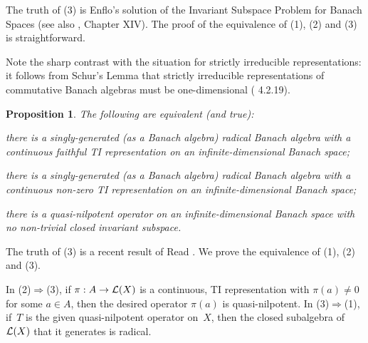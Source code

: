\documentclass[11pt]{article}
\newcounter{arbenum}
\newenvironment{arbenumerate}{\begin{list}{{\rm(\arabic{arbenum})}}%
{\usecounter{arbenum}}}{\end{list}}
\newcommand{\sseq}{\subseteq}
\newtheorem{prop}[thm]{Proposition}
\newenvironment{Proof}{{\it Proof. }}{}%
\newcommand{\Detail}[1]{}
\newcommand{\LX}{{\cal L}(X)}
\begin{document}
\begin{Proof}
The truth of (3) is Enflo's solution of the Invariant Subspace Problem for Banach
Spaces \cite{Enflo} (see also \cite{Read}, \cite{Beauzamy} Chapter XIV).
The proof of the equivalence of (1), (2) and (3) is straightforward.
\Detail{%
\begin{description}
\item{(1) $\Rightarrow$ (2)} is trivial.
\item{(2) $\Rightarrow$ (3)}.
Let~$A$ be a Banach algebra with generator~$a$ and let~$\pi$ be a continuous TI
representation of~$A$ on a Banach space~$X$ such that $\pi(a) \ne 0$.    Then
there is no non-trivial closed invariant subspace of $\pi(a)$, since any such
subspace would be invariant for $\pi(A)$, contradicting the fact that~$\pi$ is TI.
\item{(3) $\Rightarrow$ (1)}.
Given an operator~$T$ on a Banach space~$X$ with no non-trivial closed invariant
subspace, let~$A$ be the closed subalgebra of $\LX$ generated by~$T$.   Then the
natural representation of~$A$ on~$X$ is TI, faithful and continuous.
\end{description}}
\end{Proof}

Note the sharp contrast with the situation for strictly irreducible
representations:  it follows from Schur's Lemma that strictly irreducible representations of commutative
Banach algebras must be one-dimensional (\cite{Palmerbk} 4.2.19).

\begin{prop}\label{P3}
The following are equivalent (and true):
\begin{arbenumerate}
\item there is a singly-generated (as a Banach algebra) radical Banach algebra
with a continuous faithful TI representation on an infinite-dimensional Banach
space;
\item there is a singly-generated (as a Banach algebra) radical Banach algebra
with a continuous non-zero TI representation on an
infinite-dimensional Banach space;
\item there is a quasi-nilpotent operator on an infinite-dimensional Banach
space with no non-trivial closed invariant subspace.
\end{arbenumerate}
\end{prop}

\begin{Proof}
The truth of (3) is a recent result of Read \cite{Readqn}.   We prove the
equivalence of (1), (2) and (3).

In (2)$\Rightarrow$(3), if $\pi:A\to\LX$ is a continuous, TI representation with
$\pi(a)\ne 0$ for some $a\in A$, then the desired operator $\pi(a)$ is
quasi-nilpotent.  In (3)$\Rightarrow$(1), if~$T$ is the given quasi-nilpotent operator
on~$X$, then the closed subalgebra of $\LX$ that it generates is radical.
\Detail{Since~$T$ is quasi-nilpotent, so are all the polynomials in~$T$.   The
closed subalgebra $A \sseq \LX$ generated by~$T$ is a commutative Banach
algebra, so its Jacobson radical is the set of all quasi-nilpotents and this set
is closed.  Since the polynomials in~$T$ are dense in~$A$, it follows that~$A$
is Jacobson radical.}
\end{Proof}
\end{document}
